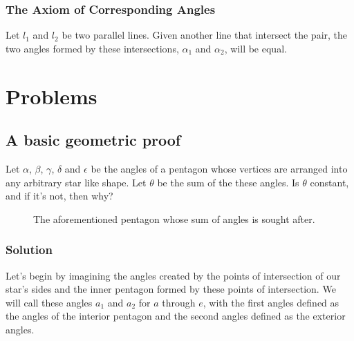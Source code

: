 \documentclass{article}
\newcommand{\solution}{\subsubsection*{\textcolor{MainColor}{Solution}}}
\theoremstyle{maintheorem}
\begin{document}
\subsubsection{The Axiom of Corresponding Angles}
Let $l_1$ and $l_2$ be two parallel lines.
Given another line that intersect the pair, the two angles formed by these intersections, $\alpha_1$ and $\alpha_2$, will be equal.


\section*{\color{MainColor}Problems} \label{Problems}

\subsection{
    A basic geometric proof
}
Let $\alpha$, $\beta$, $\gamma$, $\delta$ and $\epsilon$ be the angles of a pentagon
whose vertices are arranged into any arbitrary star like shape.
Let $\theta$ be the sum of the these angles.
Is $\theta$ constant, and if it's not, then why?

\begin{figure}[h]\label{star}
    \centering

    \caption{The aforementioned pentagon whose sum of angles is sought after.}
\end{figure}

\solution

Let's begin by imagining the angles created by the points of intersection of our star's sides
and the inner pentagon formed by these points of intersection.
We will call these angles $a_1$ and $a_2$ for $a$ through $e$,
with the first angles defined as the angles of the interior pentagon and the second angles defined as the exterior angles.
\end{document}
